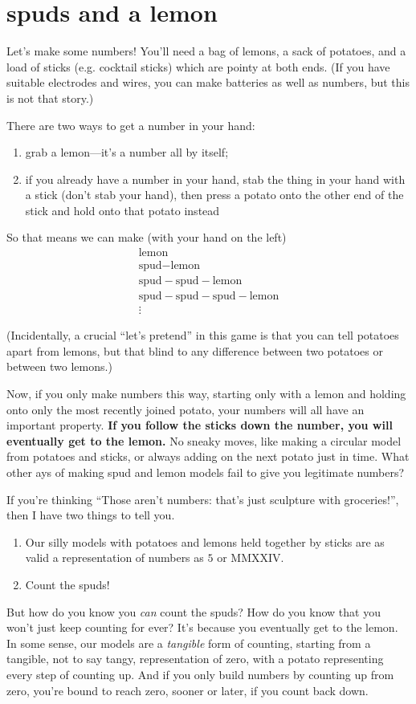 \documentclass{book}
\begin{document}
\chapter{spuds and a lemon}

Let's make some numbers! You'll need a bag of lemons, a sack of potatoes, and a load of sticks (e.g. cocktail sticks) which are pointy at both ends. (If you have suitable electrodes and wires, you can make batteries as well as numbers, but this is not that story.)

There are two ways to get a number in your hand:
\begin{enumerate}
\item grab a lemon---it's a number all by itself;
  \item if you already have a number in your hand, stab the thing in your hand with a stick (don't stab your hand), then press a potato onto the other end of the stick and hold onto that potato instead
\end{enumerate}

\newcommand{\spud}{\mbox{spud}\!\!\!-\!\!\!}
\newcommand{\lemon}{\mbox{lemon}}
So that means we can make (with your hand on the left)
\[\begin{array}{l}
\lemon\\
\spud\lemon\\
\spud\spud\lemon\\
\spud\spud\spud\lemon\\
\vdots
\end{array}\]

(Incidentally, a crucial ``let's pretend'' in this game is that you can tell potatoes apart from lemons, but that blind to any difference between two potatoes or between two lemons.)

Now, if you only make numbers this way, starting only with a lemon and holding onto only the most recently joined potato, your numbers will all have an important property. \textbf{If you follow the sticks down the number, you will eventually get to the lemon.} No sneaky moves, like making a circular model from potatoes and sticks, or always adding on the next potato just in time. What other ays of making spud and lemon models fail to give you legitimate numbers?

If you're thinking ``Those aren't numbers: that's just sculpture with groceries!'', then I have two things to tell you.
\begin{enumerate}
\item Our silly models with potatoes and lemons held together by sticks are as valid a representation of numbers as $5$ or MMXXIV.
\item Count the spuds!
\end{enumerate}
But how do you know you \emph{can} count the spuds? How do you know that you won't just keep counting for ever? It's because you eventually get to the lemon. In some sense, our models are a \emph{tangible} form of counting, starting from a tangible, not to say tangy, representation of zero, with a potato representing every step of counting up. And if you only build numbers by counting up from zero, you're bound to reach zero, sooner or later, if you count back down.
\end{document}
